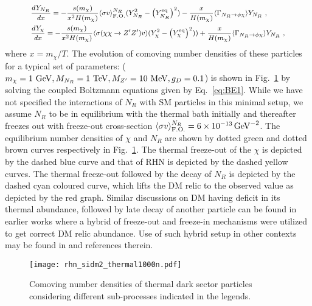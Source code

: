\documentclass[prd,nofootinbib,preprint,superscriptaddress]{revtex4}
\begin{document}
		\begin{equation}
			\footnotesize{
				\begin{aligned}
					&\frac{dY_{N_R}}{dx}= -\frac{s(m_{\chi})}{x^2  H(m_{\chi})} \langle\sigma v \rangle_{\rm F.O.}^{N_R} (Y^2_{N_R} -\big(Y^{\rm eq}_{N_R}\big)^2) -\frac{x}{H(m_{\chi})}\langle \Gamma_{N_R \rightarrow \phi \chi}\rangle Y_{N_R} \,\, ,
					\\&
					\frac{dY_{\chi}}{dx}=-\frac{s(m_{\chi})}{x^2  H(m_{\chi})}  \langle\sigma(\chi \chi  \to Z' Z') v\rangle (Y^2_{\chi}-\big(Y^{\rm eq}_{\chi}\big)^2))
					+ \frac{x}{H(m_{\chi})} \langle \Gamma_{N_R\rightarrow \phi \chi}\rangle Y_{N_R}\,\, ,
			\end{aligned}}
			\label{eq:BE1}
		\end{equation} 
		where $x=m_{\chi}/T$. The evolution of comoving number densities of these particles for a typical set of parameters: ( $m_\chi = 1 {~\rm GeV}, M_{N_{R}}=1 {~\rm TeV}, M_{Z'}=10 ~{\rm MeV}, g_D=0.1$) is shown in Fig.~\ref{Y_thermal} by solving the coupled Boltzmann equations given by Eq.~\eqref{eq:BE1}. While we have not specified the interactions of $N_R$ with SM particles in this minimal setup, we assume $N_R$ to be in equilibrium with the thermal bath initially and thereafter freezes out with freeze-out cross-section $\langle \sigma v \rangle _{\rm F.O.}^{N_R}= 6\times 10^{-13} \, {\rm GeV}^{-2}$. The equilibrium number densities of $\chi$ and $N_R$ are shown by dotted green and dotted brown curves respectively in Fig.~\ref{Y_thermal}. The thermal freeze-out of the $\chi$ is depicted by the dashed blue curve and that of RHN is depicted by the dashed yellow curves. The thermal freeze-out followed by the decay of $N_{R}$ is depicted by the dashed cyan coloured curve, which lifts the DM relic to the observed value as depicted by the red graph. Similar discussions on DM having deficit in its thermal abundance, followed by late decay of another particle can be found in earlier works \cite{Molinaro:2014lfa, Borah:2017dfn, Biswas:2018ybc, Dutta:2021wbn, Borah:2021jzu, Borah:2021yek, DEramo:2018khz} where a hybrid of freeze-out and freeze-in mechanisms were utilized to get correct DM relic abundance. Use of such hybrid setup in other contexts may be found in \cite{Feng:2003uy, Borah:2019bdi, Borah:2018gjk} and references therein.
		
		
		\begin{figure}
			\centering
			\texttt{[image: rhn\_sidm2\_thermal1000n.pdf]}
			\caption{Comoving number densities of thermal dark sector particles considering different sub-processes indicated in the legends.}
			\label{Y_thermal}
		\end{figure}
		
\end{document}
